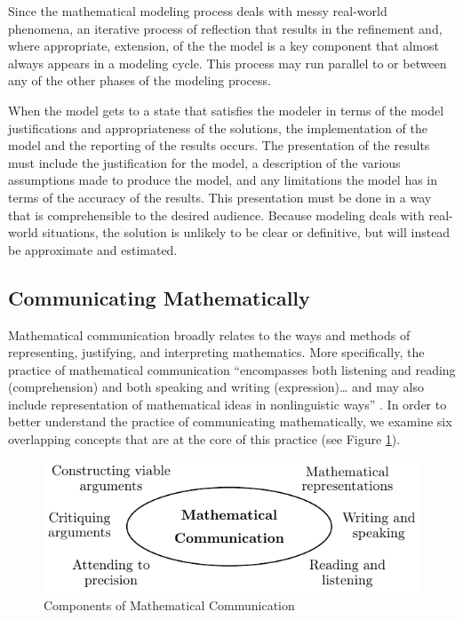 \documentclass[
]{book}
\theoremstyle{definition}
\theoremstyle{definition}
\theoremstyle{definition}
\theoremstyle{definition}
\theoremstyle{remark}
\begin{document}
Since the mathematical modeling process deals with messy real-world phenomena, an iterative process of reflection that results in the refinement and, where appropriate, extension, of the the model is a key component that almost always appears in a modeling cycle. This process may run parallel to or between any of the other phases of the modeling process.

When the model gets to a state that satisfies the modeler in terms of the model justifications and appropriateness of the solutions, the implementation of the model and the reporting of the results occurs. The presentation of the results must include the justification for the model, a description of the various assumptions made to produce the model, and any limitations the model has in terms of the accuracy of the results. This presentation must be done in a way that is comprehensible to the desired audience. Because modeling deals with real-world situations, the solution is unlikely to be clear or definitive, but will instead be approximate and estimated.

\hypertarget{communicating-mathematically}{%
\subsection{Communicating Mathematically}\label{communicating-mathematically}}

Mathematical communication broadly relates to the ways and methods of representing, justifying, and interpreting mathematics. More specifically, the practice of mathematical communication ``encompasses both listening and reading (comprehension) and both speaking and writing (expression)\ldots{} and may also include representation of mathematical ideas in nonlinguistic ways'' \citep[p.~7]{Communication}. In order to better understand the practice of communicating mathematically, we examine six overlapping concepts that are at the core of this practice (see Figure \ref{fig:communication}).

\begin{figure}

{\centering \includegraphics[width=0.6\linewidth]{tikz/communication} 

}

\caption{Components of Mathematical Communication}\label{fig:communication}
\end{figure}
\end{document}
